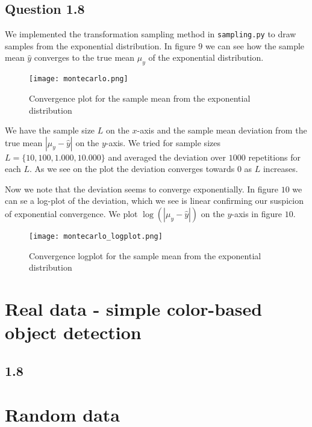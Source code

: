 \documentclass[a4paper,10pt]{article}
\begin{document}
\subsection*{Question 1.8}

We implemented the transformation sampling method in \verb=sampling.py= to draw samples from the exponential distribution. In figure $9$ we can see how the sample mean $\hat{y}$ converges to the true mean $\mu_y$ of the exponential distribution.

\begin{figure}[H]
	\centering
  	\texttt{[image: montecarlo.png]}
  	\caption{Convergence plot for the sample mean from the exponential distribution}
\end{figure}

We have the sample size $L$ on the $x$-axis and the sample mean deviation from the true mean $|\mu_y - \hat{y}|$ on the $y$-axis. We tried for sample sizes $L = \{10,100,1.000,10.000\}$ and averaged the deviation over $1000$ repetitions for each $L$. As we see on the plot the deviation converges towards $0$ as $L$ increases.

Now we note that the deviation seems to converge exponentially. In figure $10$ we can se a log-plot of the deviation, which we see is linear confirming our suspicion of exponential convergence. We plot $\log(|\mu_y - \hat{y}|)$ on the $y$-axis in figure $10$.

\begin{figure}[H]
	\centering
  	\texttt{[image: montecarlo\_logplot.png]}
  	\caption{Convergence logplot for the sample mean from the exponential distribution}
\end{figure}

\section{Real data - simple color-based object detection}

\subsection{1.8}

\newpage
\appendix

\section{Random data}
\end{document}
